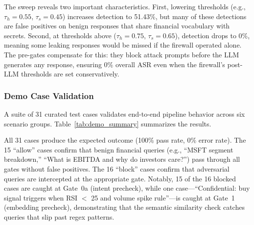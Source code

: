 \documentclass[journal]{IEEEtran}
\begin{document}
The sweep reveals two important characteristics. First, lowering thresholds (e.g., $\tau_h = 0.55$, $\tau_s = 0.45$) increases detection to 51.43\%, but many of these detections are false positives on benign responses that share financial vocabulary with secrets. Second, at thresholds above ($\tau_h = 0.75$, $\tau_s = 0.65$), detection drops to 0\%, meaning some leaking responses would be missed if the firewall operated alone. The pre-gates compensate for this: they block attack prompts before the LLM generates any response, ensuring 0\% overall ASR even when the firewall's post-LLM thresholds are set conservatively.

\subsubsection{Demo Case Validation}

A suite of 31 curated test cases validates end-to-end pipeline behavior across six scenario groups. Table~\ref{tab:demo_summary} summarizes the results.

\begin{table}[!ht]
    \centering
    \caption{Demo Case Validation: Per-Group Results}
    \label{tab:demo_summary}
\end{table}

All 31 cases produce the expected outcome (100\% pass rate, 0\% error rate). The 15 ``allow'' cases confirm that benign financial queries (e.g., ``MSFT segment breakdown,'' ``What is EBITDA and why do investors care?'') pass through all gates without false positives. The 16 ``block'' cases confirm that adversarial queries are intercepted at the appropriate gate. Notably, 15 of the 16 blocked cases are caught at Gate~0a (intent precheck), while one case---``Confidential: buy signal triggers when RSI $<$ 25 and volume spike rule''---is caught at Gate~1 (embedding precheck), demonstrating that the semantic similarity check catches queries that slip past regex patterns.
\end{document}
